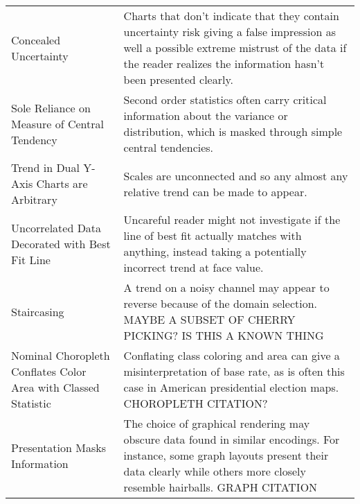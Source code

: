 \begin{table*}[]
\begin{tabular}{p{5cm}p{12cm}}
 \rowcolor{colorc-opaque}Concealed Uncertainty & Charts that don't indicate that they contain uncertainty risk giving a false impression as well a possible extreme mistrust of the data if the reader realizes the information hasn't been presented clearly.  \cite{song2018s, few2019loom, mayrTrust2019, sacha2015role}\\
 \rowcolor{colorc}Sole Reliance on Measure of Central Tendency & Second order statistics often carry critical information about the variance or distribution, which is masked through simple central tendencies.  \cite{wall2017warning, few2019loom, matejka2017same, anscombe1973graphs}\\
 \rowcolor{colorc-opaque}Trend in Dual Y-Axis Charts are Arbitrary & Scales are unconnected and so any almost any relative trend can be made to appear. \cite{KindlmannAlgebraicVisPedagogyPDV2016, cairo2015graphics}\\
 \rowcolor{colorc}Uncorrelated Data Decorated with Best Fit Line & Uncareful reader might not investigate if the line of best fit actually matches with anything, instead taking a potentially incorrect trend at face value. \\
 \rowcolor{colorc-opaque}Staircasing & A trend on a noisy channel may appear to reverse because of the domain selection. MAYBE A SUBSET OF CHERRY PICKING? IS THIS A KNOWN THING\\
 \rowcolor{colorc}Nominal Choropleth Conflates Color Area with Classed Statistic & Conflating class coloring and area can give a misinterpretation of base rate, as is often this case in American presidential election maps.  \cite{gastner2005maps} CHOROPLETH CITATION?\\
 \rowcolor{colorc-opaque}Presentation Masks Information & The choice of graphical rendering may obscure data found in similar encodings. For instance, some graph layouts present their data clearly while others more closely resemble hairballs. \cite{hofmann2012graphical} GRAPH CITATION\\


\end{tabular}
\end{table*}
